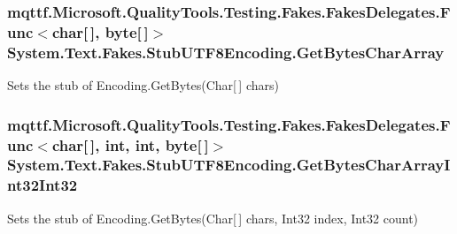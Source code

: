 \hypertarget{class_system_1_1_text_1_1_fakes_1_1_stub_u_t_f8_encoding_a4fa08965c34482fdc2685ce8498587e4}{
\subsubsection[{Get\-Bytes\-Char\-Array}]{\setlength{\rightskip}{0pt plus 5cm}mqttf.\-Microsoft.\-Quality\-Tools.\-Testing.\-Fakes.\-Fakes\-Delegates.\-Func$<$char\mbox{[}$\,$\mbox{]}, byte\mbox{[}$\,$\mbox{]}$>$ System.\-Text.\-Fakes.\-Stub\-U\-T\-F8\-Encoding.\-Get\-Bytes\-Char\-Array}}\label{class_system_1_1_text_1_1_fakes_1_1_stub_u_t_f8_encoding_a4fa08965c34482fdc2685ce8498587e4}


Sets the stub of Encoding.\-Get\-Bytes(\-Char\mbox{[}$\,$\mbox{]} chars)

\hypertarget{class_system_1_1_text_1_1_fakes_1_1_stub_u_t_f8_encoding_aeef82a1b68e51f853838945f98aa84b5}{
\subsubsection[{Get\-Bytes\-Char\-Array\-Int32\-Int32}]{\setlength{\rightskip}{0pt plus 5cm}mqttf.\-Microsoft.\-Quality\-Tools.\-Testing.\-Fakes.\-Fakes\-Delegates.\-Func$<$char\mbox{[}$\,$\mbox{]}, int, int, byte\mbox{[}$\,$\mbox{]}$>$ System.\-Text.\-Fakes.\-Stub\-U\-T\-F8\-Encoding.\-Get\-Bytes\-Char\-Array\-Int32\-Int32}}\label{class_system_1_1_text_1_1_fakes_1_1_stub_u_t_f8_encoding_aeef82a1b68e51f853838945f98aa84b5}


Sets the stub of Encoding.\-Get\-Bytes(\-Char\mbox{[}$\,$\mbox{]} chars, Int32 index, Int32 count)

